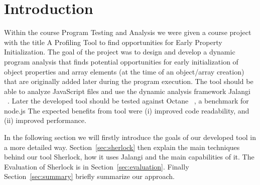 \section{Introduction}
Within the course Program Testing and Analysis we were given a course project with the title
 \glqq{}A Profiling Tool to find opportunities for Early Property Initialization\grqq{}. 
 The goal of the project was to design and develop a dynamic program analysis that finds potential  
 opportunities for early initialization of object properties and array elements 
 (at the time of an object/array creation) that are originally added later during the program execution.
 The tool should be able to analyze JavaScript files and use the dynamic analysis framework Jalangi ~\cite{jalangi}.
 Later the developed tool should be tested against Octane ~\cite{octance}, a benchmark for node.js The expected 
 benefits from tool were (i) improved code readability, and (ii) improved performance.

 In the following section
 we will firstly introduce the goals of our developed tool in a more detailed way. Section~\ref{sec:sherlock} 
 then explain the main techniques behind our tool Sherlock, how it uses Jalangi and the main capabilities of it.
 The Evaluation of Sherlock is in Section~\ref{sec:evaluation}. Finally Section~\ref{sec:summary} briefly summarize
 our approach.